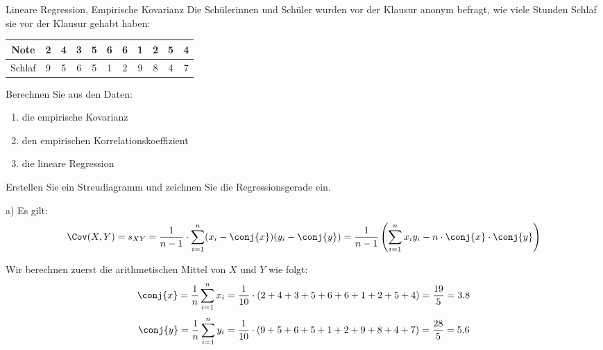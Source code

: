 \begin{example}{Lineare Regression, Empirische Kovarianz}
    Die Schülerinnen und Schüler wurden vor der Klausur anonym befragt, wie viele Stunden Schlaf sie vor der Klausur gehabt haben:
    \begin{center}
        \begin{tabular}{|c||C|C|C|C|C|C|C|C|C|C|}
            \hline
            Note   & 2 & 4 & 3 & 5 & 6 & 6 & 1 & 2 & 5 & 4 \\
            \hline
            Schlaf & 9 & 5 & 6 & 5 & 1 & 2 & 9 & 8 & 4 & 7 \\
            \hline
        \end{tabular}
    \end{center}

    Berechnen Sie aus den Daten:
    \begin{enumerate}[\alph*)]
        \item die empirische Kovarianz
        \item den empirischen Korrelationskoeffizient
        \item die lineare Regression
    \end{enumerate}

    Erstellen Sie ein Streudiagramm und zeichnen Sie die Regressionsgerade ein.

    \exampleseparator

    a) Es gilt:
    \[
        \Cov(X, Y) = s_{XY} = \frac{1}{n-1} \cdot \sum_{i=1}^{n} (x_i - \conj{x})(y_i - \conj{y}) = \frac{1}{n-1} \left( \sum_{i=1}^{n} x_iy_i - n \cdot \conj{x} \cdot \conj{y} \right)
    \]

    Wir berechnen zuerst die arithmetischen Mittel von $X$ und $Y$ wie folgt:
    \[
        \conj{x} = \frac{1}{n} \sum_{i=1}^n x_i = \frac{1}{10} \cdot (2 + 4 + 3 + 5 + 6 + 6 + 1 + 2 + 5 + 4) = \frac{19}{5} = 3.8
    \]
    \[
        \conj{y} = \frac{1}{n} \sum_{i=1}^n y_i = \frac{1}{10} \cdot (9 + 5 + 6 + 5 + 1 + 2 + 9 + 8 + 4 + 7) = \frac{28}{5} = 5.6
    \]


\end{example}
